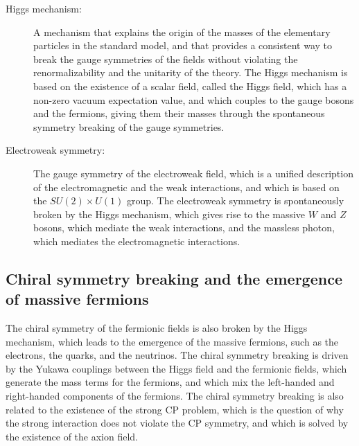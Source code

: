 \begin{tcolorbox}[colback=blue!5!white,colframe=blue!75!black,title=New terms]
    \begin{description}
        \item[Higgs mechanism:] A mechanism that explains the origin of the masses of the elementary particles in the standard model, and that provides a consistent way to break the gauge symmetries of the fields without violating the renormalizability and the unitarity of the theory. The Higgs mechanism is based on the existence of a scalar field, called the Higgs field, which has a non-zero vacuum expectation value, and which couples to the gauge bosons and the fermions, giving them their masses through the spontaneous symmetry breaking of the gauge symmetries.
        \item[Electroweak symmetry:] The gauge symmetry of the electroweak field, which is a unified description of the electromagnetic and the weak interactions, and which is based on the $SU(2) \times U(1)$ group. The electroweak symmetry is spontaneously broken by the Higgs mechanism, which gives rise to the massive $W$ and $Z$ bosons, which mediate the weak interactions, and the massless photon, which mediates the electromagnetic interactions.
    \end{description}
\end{tcolorbox}

\subsection{Chiral symmetry breaking and the emergence of massive fermions}
The chiral symmetry of the fermionic fields is also broken by the Higgs mechanism, which leads to the emergence of the massive fermions, such as the electrons, the quarks, and the neutrinos. The chiral symmetry breaking is driven by the Yukawa couplings between the Higgs field and the fermionic fields, which generate the mass terms for the fermions, and which mix the left-handed and right-handed components of the fermions. The chiral symmetry breaking is also related to the existence of the strong CP problem, which is the question of why the strong interaction does not violate the CP symmetry, and which is solved by the existence of the axion field.


